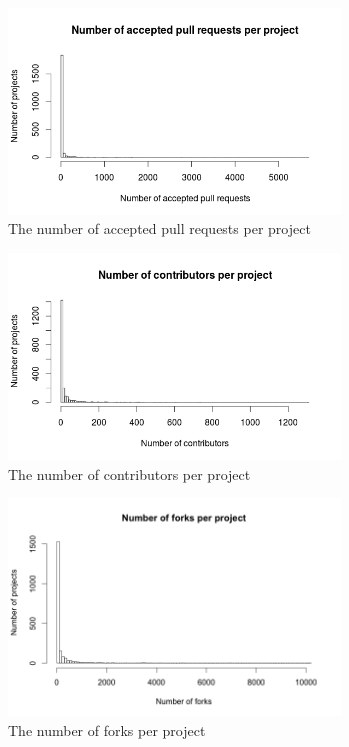 	    \begin{figure}[t!]
	        \includegraphics[width=250pt]{figures/nr-of-accepted-pull-requests-per-project}
	        \caption{The number of accepted pull requests per project}
	        \label{fig:accepted-pull-plot}
	    \end{figure}

	    \begin{figure}[t!]
	        \includegraphics[width=250pt]{figures/nr-of-contributors-per-project}
	        \caption{The number of contributors per project}
	        \label{fig:nr-contributors-plot}
	    \end{figure}

	    \begin{figure}[t!]
	        \includegraphics[width=250pt]{figures/number-of-forks-per-project}
	        \caption{The number of forks per project}
	        \label{fig:nr-forks-plot}
	    \end{figure}

